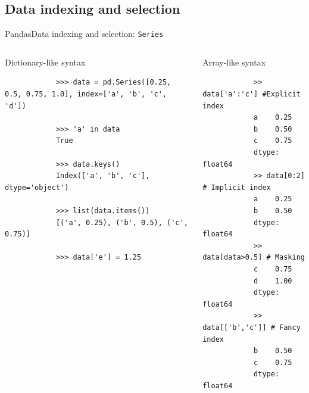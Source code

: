 \documentclass[10pt,compress]{beamer} %
\begin{document}
\subsection{Data indexing and selection}
\begin{frame}[fragile]{Pandas}{Data indexing and selection: \texttt{Series}}
	\begin{columns}
		\begin{exampleblock}{Dictionary-like syntax}
		\vspace{-0.2cm} 
			\begin{lstlisting}
			>>> data = pd.Series([0.25, 0.5, 0.75, 1.0], index=['a', 'b', 'c', 'd'])

			>>> 'a' in data
			True

			>>> data.keys()
			Index(['a', 'b', 'c'], dtype='object')

			>>> list(data.items())
			[('a', 0.25), ('b', 0.5), ('c', 0.75)]

			>>> data['e'] = 1.25
			\end{lstlisting}
			\vspace{-0.2cm} 
		\end{exampleblock}

		\begin{exampleblock}{Array-like syntax}
			\vspace{-0.2cm} 
			\begin{lstlisting}
			>> data['a':'c'] #Explicit index
			a    0.25
			b    0.50
			c    0.75
			dtype: float64
			>> data[0:2] # Implicit index
			a    0.25
			b    0.50
			dtype: float64
			>> data[data>0.5] # Masking
			c    0.75
			d    1.00
			dtype: float64
			>> data[['b','c']] # Fancy index
			b    0.50
			c    0.75
			dtype: float64
			\end{lstlisting}
			\vspace{-0.2cm} 
		\end{exampleblock}
	\end{columns}
\end{frame}
\end{document}

